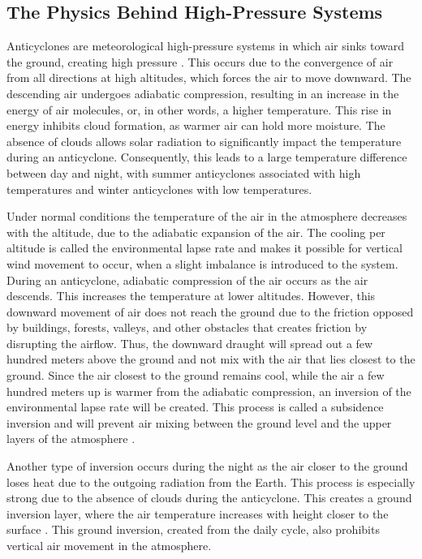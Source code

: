 \subsection{The Physics Behind High-Pressure Systems}
Anticyclones are meteorological high-pressure systems in which air sinks toward the ground, creating high pressure \cite{spiridonovCyclonesAnticyclonesSpringerLink2020}. This occurs due to the convergence of air from all directions at high altitudes, which forces the air to move downward. The descending air undergoes adiabatic compression, resulting in an increase in the energy of air molecules, or, in other words, a higher temperature. This rise in energy inhibits cloud formation, as warmer air can hold more moisture. The absence of clouds allows solar radiation to significantly impact the temperature during an anticyclone. Consequently, this leads to a large temperature difference between day and night, with summer anticyclones associated with high temperatures and winter anticyclones with low temperatures. 

Under normal conditions the temperature of the air in the atmosphere decreases with the altitude, due to the adiabatic expansion of the air. The cooling per altitude is called the environmental lapse rate and makes it possible for vertical wind movement to occur, when a slight imbalance is introduced to the system. During an anticyclone, adiabatic compression of the air occurs as the air descends. This increases the temperature at lower altitudes. However, this downward movement of air does not reach the ground due to the friction opposed by buildings, forests, valleys, and other obstacles that creates friction by disrupting the airflow. Thus, the downward draught will spread out a few hundred meters above the ground and not mix with the air that lies closest to the ground. Since the air closest to the ground remains cool, while the air a few hundred meters up is warmer from the adiabatic compression, an inversion of the environmental lapse rate will be created. This process is called a subsidence inversion and will prevent air mixing between the ground level and the upper layers of the atmosphere \cite{gramschInfluenceSurfaceSubsidence2014}.


 Another type of inversion occurs during the night as the air closer to the ground loses heat due to the outgoing radiation from the Earth. This process is especially strong due to the absence of clouds during the anticyclone. This creates a ground inversion layer, where the air temperature increases with height closer to the surface \cite{gregohareWeatherClimateClimate2005}. This ground inversion, created from the daily cycle, also prohibits vertical air movement in the atmosphere.

